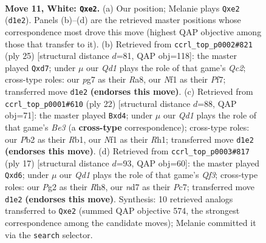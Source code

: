 \documentclass[11pt]{article}
\begin{document}
\clearpage

\begin{figure}[p]\centering
\begin{subfigure}{0.46\textwidth}\centering
\resizebox{\linewidth}{!}{%
\newchessgame
\chessboard[
  setfen={r1b1kb1r/pp1n1ppp/1q2p3/3pP3/5P2/8/PP2n1PP/R1BQKNNR w KQkq - 0 11},
  showmover=false,
  pgfstyle=straightmove, color=movearrow, markmove={d1-e2}
]}
\caption{}
\end{subfigure}\hfill
\begin{subfigure}{0.46\textwidth}\centering
\resizebox{\linewidth}{!}{%
\newchessgame
\chessboard[
  setfen={r3kb1r/ppqN1ppp/2p1pn2/8/3P4/1Q4P1/PP2PP1P/R1B1KB1R b KQkq - 0 13},
  showmover=false,
  pgfstyle=straightmove, color=movearrow, markmove={c7-d7}
]}
\caption{}
\end{subfigure}
\\[4pt]
\begin{subfigure}{0.46\textwidth}\centering
\resizebox{\linewidth}{!}{%
\newchessgame
\chessboard[
  setfen={r1b1kb1r/pp1n1ppp/4p3/1B1pP3/3n1P2/q1N1B3/P1PQ2PP/1R2K2R w Kkq - 0 12},
  showmover=false,
  pgfstyle=straightmove, color=movearrow, markmove={e3-d4}
]}
\caption{}
\end{subfigure}\hfill
\begin{subfigure}{0.46\textwidth}\centering
\resizebox{\linewidth}{!}{%
\newchessgame
\chessboard[
  setfen={r1b1k2r/pppp1ppp/2nN1q2/8/2Q1P3/8/PPP2PPP/R1B1KB1R b KQkq - 0 9},
  showmover=false,
  pgfstyle=straightmove, color=movearrow, markmove={f6-d6}
]}
\caption{}
\end{subfigure}
\caption{\textbf{Move 11, White: \texttt{Qxe2}.} (a) Our position; Melanie plays \texttt{Qxe2} (\texttt{d1e2}). Panels (b)--(d) are the retrieved master positions whose correspondence most drove this move (highest QAP objective among those that transfer to it). (b) Retrieved from \texttt{ccrl\_top\_p0002\#821} (ply 25) [structural distance $d$=81, QAP obj=118]: the master played \texttt{Qxd7}; under $\mu$ our \emph{Qd1} plays the role of that game's \emph{Qc2}; cross-type roles: our \emph{p}g7 as their \emph{R}a8, our \emph{N}f1 as their \emph{P}f7; transferred move \texttt{d1e2} \textbf{(endorses this move)}. (c) Retrieved from \texttt{ccrl\_top\_p0001\#610} (ply 22) [structural distance $d$=88, QAP obj=71]: the master played \texttt{Bxd4}; under $\mu$ our \emph{Qd1} plays the role of that game's \emph{Be3} (a \textbf{cross-type} correspondence); cross-type roles: our \emph{P}b2 as their \emph{R}b1, our \emph{N}f1 as their \emph{R}h1; transferred move \texttt{d1e2} \textbf{(endorses this move)}. (d) Retrieved from \texttt{ccrl\_top\_p0003\#817} (ply 17) [structural distance $d$=93, QAP obj=60]: the master played \texttt{Qxd6}; under $\mu$ our \emph{Qd1} plays the role of that game's \emph{Qf3}; cross-type roles: our \emph{P}g2 as their \emph{R}h8, our \emph{n}d7 as their \emph{P}c7; transferred move \texttt{d1e2} \textbf{(endorses this move)}. Synthesis: 10 retrieved analogs transferred to \texttt{Qxe2} (summed QAP objective 574, the strongest correspondence among the candidate moves); Melanie committed it via the \texttt{search} selector.}
\label{fig:thought-m20}
\end{figure}
\end{document}
